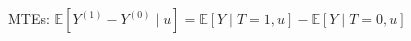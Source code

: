 \documentclass[preview]{standalone}
\begin{document}
\begin{center}
MTEs: $\mathbb{E}[Y^{(1)} - Y^{(0)} \; | \; u] = \mathbb{E}[Y \; | \; T=1, u] - \mathbb{E}[Y \; | \; T=0, u]$
\end{center}
\end{document}
